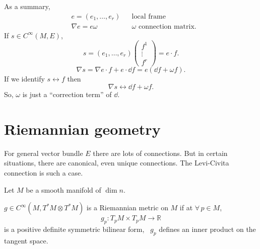 \documentclass[12pt]{article}
\begin{document}
As a summary, 
\begin{align*}
    &e=(e_1,\ldots,e_r) && \text{local frame} \\ 
    &\nabla e=e\omega && \omega\text{ connection matrix}
.\end{align*}
If \(s\in C^\infty(M,E)\), \[
    s=(e_1,\ldots,e_r)\begin{pmatrix} f^1\\ \vdots\\ f^r \end{pmatrix}=e\cdot f
.\] \[
    \nabla s=\nabla e\cdot f+e\cdot \dd{f}=e(\dd{f}+\omega f)
.\] If we identify \(s\leftrightarrow f\) then \[
    \nabla s\longleftrightarrow \dd{f}+\omega f
.\] So, \(\omega\) is just a ``correction term'' of \(\dd\).

\section{Riemannian geometry}
For general vector bundle \(E\) there are lots of connections. But in certain
situations, there are canonical, even unique connections. The Levi-Civita connection 
is such a case.

Let \(M\) be a smooth manifold of \(\dim n\).
\begin{definition}
    \(g\in C^\infty(M,T^*M\otimes T^*M)\) is a Riemannian metric on \(M\) if at 
    \(\forall\,p\in M\), \[
        g_p\colon T_p M\times T_p M\longrightarrow \mathbb{R}
    \] is a positive definite symmetric bilinear form, \ie\ \(g_p\) defines an inner
    product on the tangent space.
\end{definition}
\end{document}
